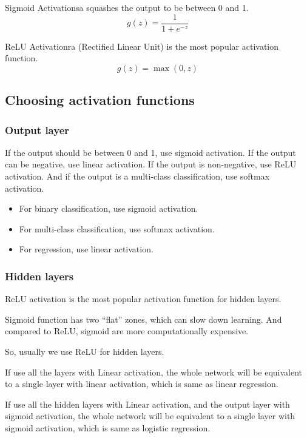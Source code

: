 \begin{dfnbox}{Sigmoid Activation}{sa}
     squashes the output to be between 0 and 1.
    \begin{equation}
        g(z) = \frac{1}{1 + e^{-z}}
    \end{equation}
\end{dfnbox}

\begin{dfnbox}{ReLU Activation}{ra}
     (Rectified Linear Unit) is the most popular activation function.
    \begin{equation}
        g(z) = \max(0, z)
    \end{equation}
\end{dfnbox}

\subsection*{Choosing activation functions}
\subsubsection*{Output layer}
If the output should be between 0 and 1, use sigmoid activation. If the output can be negative, use linear activation.
If the output is non-negative, use ReLU activation. And if the output is a multi-class classification, use softmax activation. 
\begin{itemize}
    \item For binary classification, use sigmoid activation.
    \item For multi-class classification, use softmax activation.
    \item For regression, use linear activation.    
\end{itemize}
\subsubsection*{Hidden layers}
ReLU activation is the most popular activation function for hidden layers.\par
Sigmoid function has two ``flat'' zones, which can slow down learning.
And compared to ReLU, sigmoid are more computationally expensive.\par
So, usually we use ReLU for hidden layers.

\vspace{2em}
\begin{notebox}
    \hspace{2em}If use all the layers with Linear activation, 
    the whole network will be equivalent to a single layer with linear activation, which is same as linear regression.
    \par
    \hspace{2em}If use all the hidden layers with Linear activation, and the output layer with sigmoid activation,
    the whole network will be equivalent to a single layer with sigmoid activation, which is same as logistic regression.
\end{notebox}

